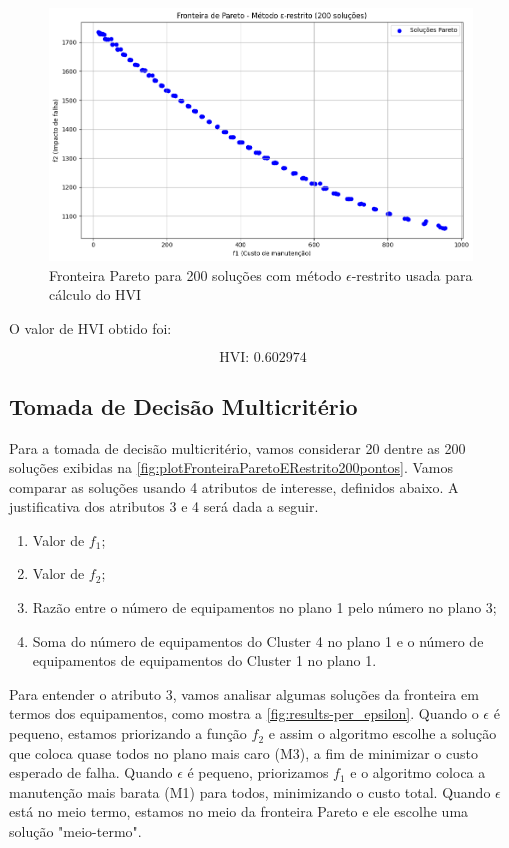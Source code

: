 \documentclass[conference]{IEEEtran}
\newcommand{\un}[1]{\;\text{#1}}
\begin{document}
\begin{figure}[htbp]
    \centering
    \includegraphics[width=\columnwidth,trim=1 1 1 1,clip]{plotFronteiraParetoERestrito200pontos.png}
    \caption{\label{fig:plotFronteiraParetoERestrito200pontos}Fronteira Pareto para 200 soluções com método $\epsilon$-restrito usada para cálculo do HVI}
\end{figure}

O valor de HVI obtido foi:

\begin{equation}\label{eq:HVI}
	\un{HVI: }0.602974
\end{equation}

\subsection{Tomada de Decisão Multicritério}

Para a tomada de decisão multicritério, vamos considerar 20 dentre as 200 soluções exibidas na 
\autoref{fig:plotFronteiraParetoERestrito200pontos}. Vamos comparar as soluções usando 4 atributos
de interesse, definidos abaixo. A justificativa dos atributos 3 e 4 será dada a seguir.

\begin{enumerate}
	\item Valor de $f_1$;
	\item Valor de $f_2$;
	\item Razão entre o número de equipamentos no plano 1 pelo número no plano 3;
	\item Soma do número de equipamentos do Cluster 4 no plano 1 e o número de equipamentos 
	de equipamentos do Cluster 1 no plano 1.
\end{enumerate}

Para entender o atributo 3, vamos analisar algumas soluções da fronteira em termos dos equipamentos,
como mostra a \autoref{fig:results-per_epsilon}. Quando o $\epsilon$ é pequeno, estamos 
priorizando a função $f_2$ e assim o algoritmo escolhe a solução que coloca quase 
todos no plano mais caro (M3), a fim de minimizar o custo esperado de falha. Quando $\epsilon$ 
é pequeno, priorizamos $f_1$ e o algoritmo coloca a manutenção mais barata (M1) para todos, 
minimizando o custo total. Quando $\epsilon$ está no meio termo, estamos no meio da fronteira Pareto 
e ele escolhe uma solução "meio-termo".
\end{document}
